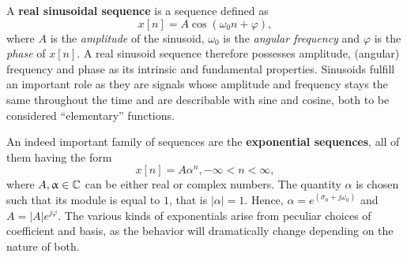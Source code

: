 \documentclass[\documentfontsize, twocolumn]{\classname}
\begin{document}
\begin{center}
\end{center}

A \textbf{real sinusoidal se\-quen\-ce} is a se\-quen\-ce defined as \[x[n] = A\cos{(\omega_0 n + \varphi)},\] where $A$ is the \emph{amplitude} of the sinusoid, $\omega_0$ is the \emph{angular frequency} and $\varphi$ is the \emph{phase} of $x[n]$. A real sinusoid se\-quen\-ce therefore possesses amplitude, (angular) frequency and phase as its intrinsic and fundamental properties. Sinusoids fulfill an important role as they are signals whose amplitude and frequency stays the same throughout the time and are describable with sine and cosine, both to be considered ``elementary'' functions.

An indeed important family of se\-quen\-ces are the \textbf{exponential se\-quen\-ces}, all of them having the form \[x[n] = A\alpha^n, -\infty < n < \infty,\] where $A, \upalpha \in \mathbb C$ can be either real or complex numbers.
The quantity $\alpha$ is chosen such that its module is equal to $1$, that is $|\alpha| = 1$.
Hence, $\alpha = e^{(\sigma_0 + j \omega_0)}$ and $A = |A|e^{j\varphi}$.
The various kinds of exponentials arise from peculiar choices of coefficient and basis, as the behavior will dramatically change depending on the nature of both.
\end{document}
